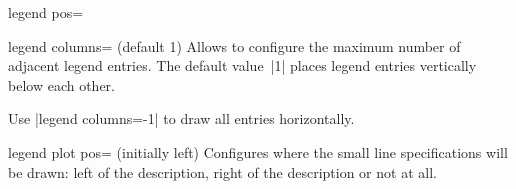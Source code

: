{\begin{pgfplotskey}{legend pos=}
\begin{codeexample}[]
\end{codeexample}

\begin{codeexample}[]
\end{codeexample}

\begin{codeexample}[]
\end{codeexample}
\end{pgfplotskey}

}

\begin{pgfplotskey}{legend columns= (default 1)}
Allows to configure the maximum number of adjacent legend entries. The default value~|1| places legend entries vertically below each other. 

Use |legend columns=-1| to draw all entries horizontally.
\end{pgfplotskey}

\begin{pgfplotskey}{legend plot pos= (initially left)}
Configures where the small line specifications will be drawn: left of the description, right of the description or not at all.
\end{pgfplotskey}

